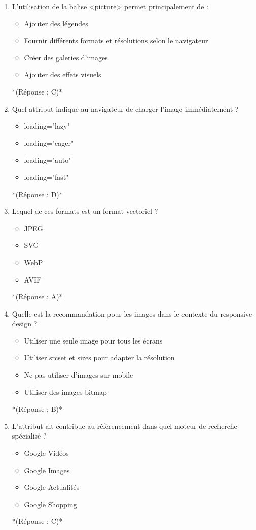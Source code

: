 \documentclass[12pt,a4paper,twoside]{report}
\begin{document}
\begin{enumerate}
\item L'utilisation de la balise <picture> permet principalement de :
\begin{itemize}
\item[A)] Ajouter des légendes
\item[B)] Fournir différents formats et résolutions selon le navigateur
\item[C)] Créer des galeries d'images
\item[D)] Ajouter des effets visuels
\end{itemize}
*(Réponse : C)*

\item Quel attribut indique au navigateur de charger l'image immédiatement ?
\begin{itemize}
\item[A)] loading="lazy"
\item[B)] loading="eager"
\item[C)] loading="auto"
\item[D)] loading="fast"
\end{itemize}
*(Réponse : D)*

\item Lequel de ces formats est un format vectoriel ?
\begin{itemize}
\item[A)] JPEG
\item[B)] SVG
\item[C)] WebP
\item[D)] AVIF
\end{itemize}
*(Réponse : A)*

\item Quelle est la recommandation pour les images dans le contexte du responsive design ?
\begin{itemize}
\item[A)] Utiliser une seule image pour tous les écrans
\item[B)] Utiliser srcset et sizes pour adapter la résolution
\item[C)] Ne pas utiliser d'images sur mobile
\item[D)] Utiliser des images bitmap
\end{itemize}
*(Réponse : B)*

\item L'attribut alt contribue au référencement dans quel moteur de recherche spécialisé ?
\begin{itemize}
\item[A)] Google Vidéos
\item[B)] Google Images
\item[C)] Google Actualités
\item[D)] Google Shopping
\end{itemize}
*(Réponse : C)*


\end{enumerate}
\end{document}
